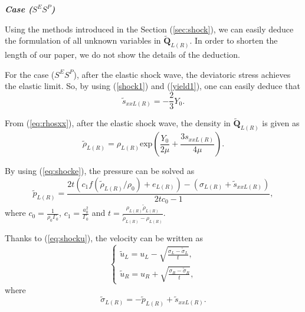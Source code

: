 \documentclass{article}
\numberwithin{equation}{section}
\numberwithin{table}{section}
\begin{document}
\emph{\textbf{Case ($S^{E}S^{P}$)}}

Using the methods introduced in  the Section (\ref{sec:shock}), we can easily deduce the formulation of all unknown variables in $\tilde{\mathbf{Q}}_{L(R)}$. In order to shorten the length of our paper, we do not show the details of the deduction.

For the case ($S^{E}S^{P}$), after the elastic shock wave, the deviatoric stress achieves the elastic limit. So, by using (\ref{shock1}) and (\ref{yield1}), one can easily deduce that
\begin{equation*}
\tilde{s}_{xxL(R)} = -\frac{2}{3}Y_0.
\end{equation*}

From (\ref{eq:rhosxx}), after the elastic shock wave, the density in $\tilde{\mathbf{Q}}_{L(R)}$ is given as
\begin{equation*}
\tilde{\rho}_{L(R)} = \rho_{L(R)} \text{exp}\left(\frac{Y_0}{2\mu}+\frac{3 s_{xxL(R)}}{4\mu}\right).
\end{equation*}


By using (\ref{eq:shocke}), the pressure can be solved as
\begin{equation}
  \tilde{p}_{L(R)}=
  \frac{2t(c_1f(\tilde{\rho}_{L(R)}/\rho_0)+e_{L(R)})-(\sigma_{L(R)}+\tilde{s}_{xxL(R)})}{2tc_0-1},
\end{equation}
where $c_0 = \frac{1}{\rho_0\Gamma_0}$, $c_1 = \frac{a_0^2}{\Gamma_0}$ and $ t=\frac{\rho_{L(R)} \tilde{\rho}_{L(R)}}{\tilde{\rho}_{L(R)}-\rho_{L(R)}}$.

Thanks to (\ref{eq:shocku}), the velocity can be written as
\begin{equation}
 \left\{ \begin{array}{ll}
   \tilde{u}_{L}= u_L -\sqrt{\frac{\sigma_L-\tilde{\sigma}_{L}}{t}},\\
	   \tilde{u}_{R} =   u_R +\sqrt{\frac{\sigma_R-\tilde{\sigma}_{R}}{t}},
   \end{array}
 \right.
 \end{equation}
 where
 \begin{equation}
   \tilde{\sigma}_{L(R)} = -\tilde{p}_{L(R)} + \tilde{s}_{xxL(R)}.
 \end{equation}
\end{document}
